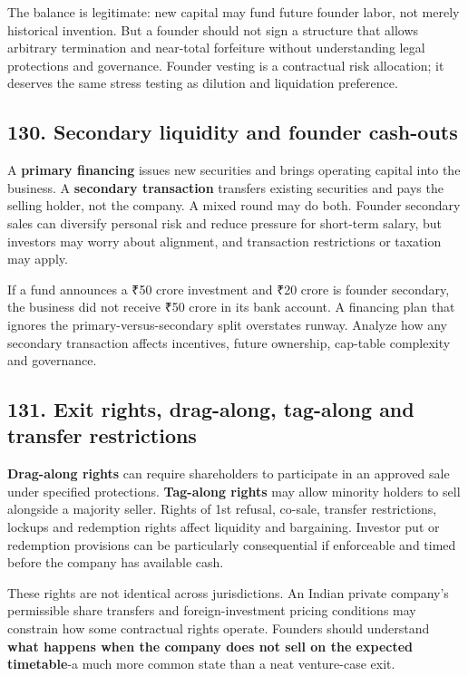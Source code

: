 The balance is legitimate: new capital may fund future founder labor, not merely historical invention. But a founder should not sign a structure that allows arbitrary termination and near-total forfeiture without understanding legal protections and governance. Founder vesting is a contractual risk allocation; it deserves the same stress testing as dilution and liquidation preference.

\subsection{130. Secondary liquidity and founder cash-outs}


A \textbf{primary financing} issues new securities and brings operating capital into the business. A \textbf{secondary transaction} transfers existing securities and pays the selling holder, not the company. A mixed round may do both. Founder secondary sales can diversify personal risk and reduce pressure for short-term salary, but investors may worry about alignment, and transaction restrictions or taxation may apply.

If a fund announces a ₹50 crore investment and ₹20 crore is founder secondary, the business did not receive ₹50 crore in its bank account. A financing plan that ignores the primary-versus-secondary split overstates runway. Analyze how any secondary transaction affects incentives, future ownership, cap-table complexity and governance.

\subsection{131. Exit rights, drag-along, tag-along and transfer restrictions}


\textbf{Drag-along rights} can require shareholders to participate in an approved sale under specified protections. \textbf{Tag-along rights} may allow minority holders to sell alongside a majority seller. Rights of 1st refusal, co-sale, transfer restrictions, lockups and redemption rights affect liquidity and bargaining. Investor put or redemption provisions can be particularly consequential if enforceable and timed before the company has available cash.

These rights are not identical across jurisdictions. An Indian private company's permissible share transfers and foreign-investment pricing conditions may constrain how some contractual rights operate. Founders should understand \textbf{what happens when the company does not sell on the expected timetable}-a much more common state than a neat venture-case exit.

